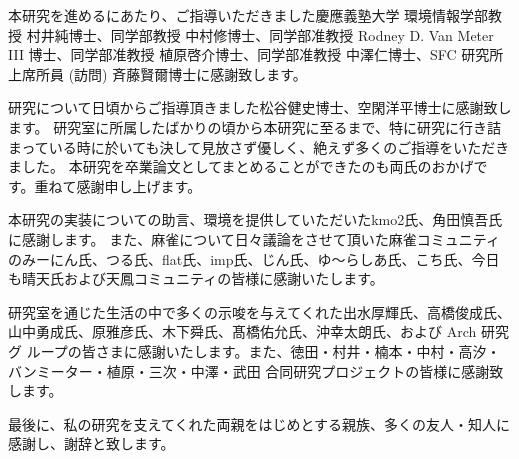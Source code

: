 \begin{acknowledgment}

本研究を進めるにあたり、ご指導いただきました慶應義塾大学 環境情報学部教授 村井純博士、同学部教授 中村修博士、同学部准教授 Rodney D. Van Meter III 博士、同学部准教授 植原啓介博士、同学部准教授 中澤仁博士、SFC 研究所 上席所員 (訪問) 斉藤賢爾博士に感謝致します。

研究について日頃からご指導頂きました松谷健史博士、空閑洋平博士に感謝致します。
研究室に所属したばかりの頃から本研究に至るまで、特に研究に行き詰まっている時に於いても決して見放さず優しく、絶えず多くのご指導をいただきました。
本研究を卒業論文としてまとめることができたのも両氏のおかげです。重ねて感謝申し上げます。

本研究の実装についての助言、環境を提供していただいたkmo2氏、角田慎吾氏に感謝します。
また、麻雀について日々議論をさせて頂いた麻雀コミュニティのみーにん氏、つる氏、flat氏、imp氏、じん氏、ゆ〜らしあ氏、こち氏、今日も晴天氏および天鳳コミュニティの皆様に感謝いたします。

研究室を通じた生活の中で多くの示唆を与えてくれた出水厚輝氏、高橋俊成氏、山中勇成氏、原雅彦氏、木下舜氏、髙橋佑允氏、沖幸太朗氏、および Arch 研究グ
ループの皆さまに感謝いたします。また、徳田・村井・楠本・中村・高汐・バンミーター・植原・三次・中澤・武田 合同研究プロジェクトの皆様に感謝致します。

最後に、私の研究を支えてくれた両親をはじめとする親族、多くの友人・知人に感謝し、謝辞と致します。

\end{acknowledgment}

